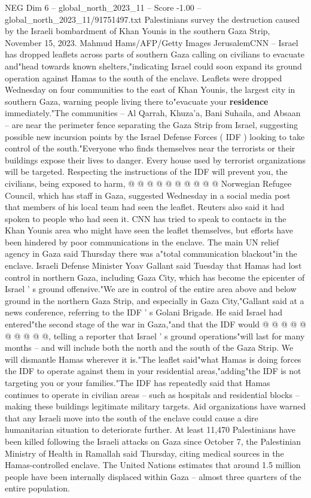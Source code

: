 \begin{textsample}{NEG Dim 6 – global\_north\_2023\_11 – Score -1.00 – global\_north\_2023\_11/91751497.txt}  \label{ex:f6_neg_200}
Palestinians survey the destruction caused by the Israeli bombardment of Khan Younis in the southern Gaza Strip, November 15, 2023.
Mahmud Hams/AFP/Getty Images JerusalemCNN -- Israel has dropped leaflets across parts of southern Gaza calling on civilians to evacuate and"head towards known shelters,"indicating Israel could soon expand its ground operation against Hamas to the south of the enclave.
Leaflets were dropped Wednesday on four communities to the east of Khan Younis, the largest city in southern Gaza, warning people living there to"evacuate your \textbf{residence} immediately."The communities -- Al Qarrah, Khuza'a, Bani Suhaila, and Absaan -- are near the perimeter fence separating the Gaza Strip from Israel, suggesting possible new incursion points by the Israel Defense Forces ( IDF ) looking to take control of the south."Everyone who finds themselves near the terrorists or their buildings expose their lives to danger.
Every house used by terrorist organizations will be targeted.
Respecting the instructions of the IDF will prevent you, the civilians, being exposed to harm, @ @ @ @ @ @ @ @ @ @ Norwegian Refugee Council, which has staff in Gaza, suggested Wednesday in a social media post that members of his local team had seen the leaflet.
Reuters also said it had spoken to people who had seen it.
CNN has tried to speak to contacts in the Khan Younis area who might have seen the leaflet themselves, but efforts have been hindered by poor communications in the enclave.
The main UN relief agency in Gaza said Thursday there was a"total communication blackout"in the enclave.
Israeli Defense Minister Yoav Gallant said Tuesday that Hamas had lost control in northern Gaza, including Gaza City, which has become the epicenter of Israel ' s ground offensive."We are in control of the entire area above and below ground in the northern Gaza Strip, and especially in Gaza City,"Gallant said at a news conference, referring to the IDF ' s Golani Brigade.
He said Israel had entered"the second stage of the war in Gaza,"and that the IDF would @ @ @ @ @ @ @ @ @ @, telling a reporter that Israel ' s ground operations"will last for many months -- and will include both the north and the south of the Gaza Strip.
We will dismantle Hamas wherever it is."The leaflet said"what Hamas is doing forces the IDF to operate against them in your residential areas,"adding"the IDF is not targeting you or your families."The IDF has repeatedly said that Hamas continues to operate in civilian areas -- such as hospitals and residential blocks -- making these buildings legitimate military targets.
Aid organizations have warned that any Israeli move into the south of the enclave could cause a dire humanitarian situation to deteriorate further.
At least 11,470 Palestinians have been killed following the Israeli attacks on Gaza since October 7, the Palestinian Ministry of Health in Ramallah said Thursday, citing medical sources in the Hamas-controlled enclave.
The United Nations estimates that around 1.5 million people have been internally displaced within Gaza -- almost three quarters of the entire population.

\end{textsample}
